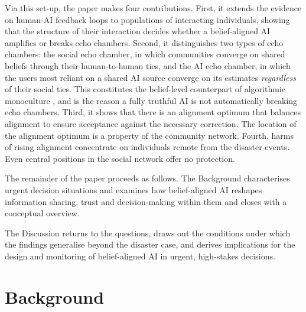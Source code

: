 \documentclass[pdflatex,sn-basic]{sn-jnl}
\begin{document}
Via this set-up, the paper makes four contributions. First, it extends the evidence on human-AI feedback loops to populations of interacting individuals, showing that the structure of their interaction decides whether a belief-aligned AI amplifies or breaks echo chambers. Second, it distinguishes two types of echo chambers: the social echo chamber, in which communities converge on shared beliefs through their human-to-human ties, and the AI
echo chamber, in which the users most reliant on a shared AI source converge on its estimates \textit{regardless} of their social ties. This constitutes the belief-level counterpart of algorithmic monoculture \citep{kleinberg2021monoculture}, and is the reason a fully truthful AI is not automatically breaking echo chambers. Third, it shows that there is an alignment optimum that balances alignment to ensure acceptance against the necessary correction. The location of the alignment optimum is a property of
the community network. Fourth, harms of rising
alignment concentrate on individuals remote from the disaster events. Even central positions in the social network offer no protection.
 
 
The remainder of the paper proceeds as follows. The Background characterises urgent decision situations and examines how belief-aligned
AI reshapes information sharing, trust and decision-making within them and closes with a conceptual overview. 


The Discussion returns to the questions, draws out the conditions under which the findings generalise beyond the disaster case, and derives implications for the design and monitoring of belief-aligned
AI in urgent, high-stakes decisions.


\section{Background}\label{sec:background}
\end{document}
